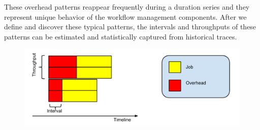 \documentclass[final,5p,times,twocolumn]{elsarticle}
\begin{document}
These overhead patterns reappear frequently during a duration series and they represent unique behavior of the workflow management components. After we define and discover these typical patterns, the intervals and throughputs of these patterns can be estimated and statistically captured from historical traces. 








\begin{figure}[htb]
\centering
 \includegraphics[width=1\linewidth]{figure/incremental.pdf}
  \label{fig:ipp}
  \vspace{-10pt}
\end{figure}

\end{document}
